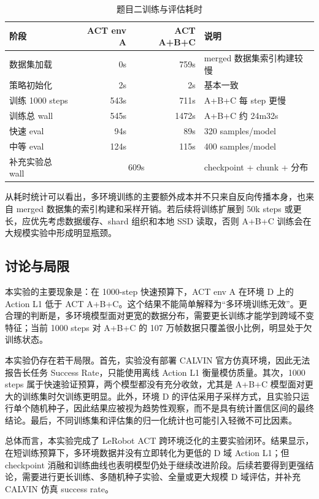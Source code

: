 \documentclass[12pt,a4paper]{ctexart}
\begin{document}
\begin{table}[H]
    \centering
    \caption{题目二训练与评估耗时}
    \begin{tabular}{lrrl}
        \toprule
        阶段 & ACT env A & ACT A+B+C & 说明 \\
        \midrule
        数据集加载 & 0s & 759s & merged 数据集索引构建较慢 \\
        策略初始化 & 2s & 2s & 基本一致 \\
        训练 1000 steps & 543s & 711s & A+B+C 每 step 更慢 \\
        训练总 wall & 545s & 1472s & A+B+C 约 24m32s \\
        快速 eval & 94s & 89s & 320 samples/model \\
        中等 eval & 124s & 115s & 400 samples/model \\
        补充实验总 wall & \multicolumn{2}{c}{609s} & checkpoint + chunk + 分布 \\
        \bottomrule
    \end{tabular}
\end{table}

从耗时统计可以看出，多环境训练的主要额外成本并不只来自反向传播本身，也来自 merged 数据集的索引构建和采样开销。若后续将训练扩展到 50k steps 或更长，应优先考虑数据缓存、shard 组织和本地 SSD 读取，否则 A+B+C 训练会在大规模实验中形成明显瓶颈。

\subsection{讨论与局限}

本实验的主要现象是：在 1000-step 快速预算下，ACT env A 在环境 D 上的 Action L1 低于 ACT A+B+C。这个结果不能简单解释为“多环境训练无效”。更合理的判断是，多环境模型面对更宽的数据分布，需要更长训练才能学到跨域不变特征；当前 1000 steps 对 A+B+C 的 107 万帧数据只覆盖很小比例，明显处于欠训练状态。

本实验仍存在若干局限。首先，实验没有部署 CALVIN 官方仿真环境，因此无法报告长任务 Success Rate，只能使用离线 Action L1 衡量模仿质量。其次，1000 steps 属于快速验证预算，两个模型都没有充分收敛，尤其是 A+B+C 模型面对更大的训练集时欠训练更明显。此外，环境 D 的评估采用子采样方式，且实验只运行单个随机种子，因此结果应被视为趋势性观察，而不是具有统计置信区间的最终结论。最后，不同训练集和评估集的归一化统计也可能引入轻微不可比因素。

总体而言，本实验完成了 LeRobot ACT 跨环境泛化的主要实验闭环。结果显示，在短训练预算下，多环境数据并没有立即转化为更低的 D 域 Action L1；但 checkpoint 消融和训练曲线也表明模型仍处于继续改进阶段。后续若要得到更强结论，需要进行更长训练、多随机种子实验、全量或更大规模 D 域评估，并补充 CALVIN 仿真 success rate。
\end{document}
